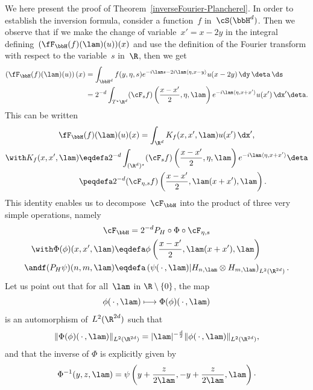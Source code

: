 We here present the proof of Theorem~\ref{inverseFourier-Plancherel}. In order to establish the inversion formula, consider a function~$f$ in~$\cS(\bbH^d)$. Then we observe that if we make the change of variable~$x'= x-2y$ in the integral defining~$(\fF_{\bbH}(f)(\lam)(u))(x)$ and use the definition of the Fourier transform with respect to the variable~$s$ in~$\R$, then we get
\begin{equation}
\begin{aligned}\label{formulaFourerHbis-1}
\left(\fF_{\bbH}(f)(\lam)(u)\right)(x) &=
\int_{\bbH^d} f(y,\eta,s) e^{-i\lam s -2i\lam \langle \eta, x-y\rangle} u(x-2y)\,\dy\,\deta\, \ds\\
&= 2^{-d}\int_{T^\star \R^d} (\cF_s f)\left(\frac {x-x'} 2,\eta, \lam\right) e^{-i\lam \langle \eta, x+x'\rangle} u(x') \,\dx'\deta.
\end{aligned}
\end{equation}
This can be written
\begin{equation}\label{formulaFourerHbis}
\begin{gathered}
\fF_{\bbH}(f)(\lam) (u)(x) = \int_{\R^d} K_f(x,x',\lam) u(x')\, \dx',\\
\begin{aligned}
\with K_f(x,x',\lam) &\eqdefa 2^{-d} \int_{(\R^d)^\star } (\cF_s f)\left(\frac {x-x'} 2,\eta, \lam\right) e^{-i\lam \langle \eta, x+x'\rangle} \deta\\
&\peqdefa 2^{-d} (\cF_{\eta,s} f)\left(\frac {x-x'} 2,\lam(x+x'), \lam\right).
\end{aligned}
\end{gathered}
\end{equation}
This identity enables us to decompose~$\cF_\bbH$ into the product of three very simple operations, namely
\begin{equation}\label{decomF_H}
\begin{gathered}
\cF_\bbH = 2^{-d}P_H \circ \Phi\circ \cF_{\eta,s}\\
\begin{aligned}
\with \Phi(\phi)(x,x',\lam) & \eqdefa \phi \left(\frac {x-x'} 2,\lam(x+x'), \lam\right)\\
\andf (P_H\psi)(n,m,\lam) & \eqdefa \left(\psi({\,\cdot\,},\lam)| H_{n,\lam} \otimes H_{m,\lam}\right)_{L^2(\R^{2d})}.
\end{aligned}
\end{gathered}
\end{equation}
Let us point out that for all~$\lam$ in $\R\setminus\{0\}$, the map
\[
\phi({\,\cdot\,},\lam) \longmapsto \Phi(\phi)({\,\cdot\,}, \lam)
\]
is an automorphism of~$L^2(\R^{2d})$ such that
\begin{equation}\label{inverseFourierL2demoeq1}
\|\Phi(\phi) ({\,\cdot\,},\lam)\|_{L^2(\R^{2d})} =|\lam|^{- \frac d 2} \|\phi({\,\cdot\,},\lam)\|_{L^2(\R^{2d})},
\end{equation}
and that the inverse of $\Phi$ is explicitly given by
\begin{equation}\label{inverseFourierL2demoeq2}
\Phi^{-1} (y,z,\lam)= \psi \left (y+\frac z {2\lam}, -y+\frac z {2\lam}, \lam \right)\cdotp
\end{equation}

